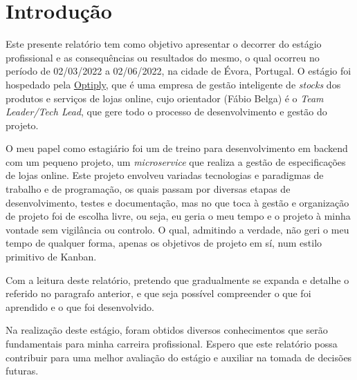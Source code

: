 \chapter{Introdução}
\label{intro}

Este presente relatório tem como objetivo apresentar o decorrer do estágio profissional e as consequências ou resultados do mesmo, o qual ocorreu no período de 02/03/2022 a 02/06/2022, na cidade de Évora, Portugal. O estágio foi hospedado pela \href{https://optiply.nl/}{Optiply}, que é uma empresa de gestão inteligente de \textit{stocks} dos produtos e serviços de lojas online, cujo orientador (Fábio Belga) é o \textit{Team Leader/Tech Lead}, que gere todo o processo de desenvolvimento e gestão do projeto.

O meu papel como estagiário foi um de treino para desenvolvimento em backend com um pequeno projeto, um \textit{microservice} que realiza a gestão de especificações de lojas online. Este projeto envolveu variadas tecnologias e paradigmas de trabalho e de programação, os quais passam por diversas etapas de desenvolvimento, testes e documentação, mas no que toca à gestão e organização de projeto foi de escolha livre, ou seja, eu geria o meu tempo e o projeto à minha vontade sem vigilância ou controlo. O qual, admitindo a verdade, não geri o meu tempo de qualquer forma, apenas os objetivos de projeto em sí, num estilo primitivo de Kanban.

Com a leitura deste relatório, pretendo que gradualmente se expanda e detalhe o referido no paragrafo anterior, e que seja possível compreender o que foi aprendido e o que foi desenvolvido.

Na realização deste estágio, foram obtidos diversos conhecimentos que serão fundamentais para minha carreira profissional. Espero que este relatório possa contribuir para uma melhor avaliação do estágio e auxiliar na tomada de decisões futuras.